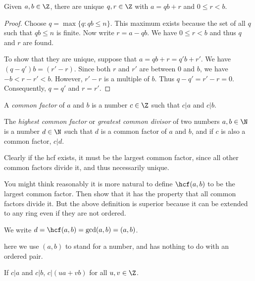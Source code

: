 \documentclass[a4paper]{article}
\begin{document}
  \begin{thm}
    Given $a, b\in \Z$, there are unique $q, r\in \Z$ with $a = qb + r$ and $0\leq r < b$.
  \end{thm}

  \begin{proof}
    Choose $q = \max\{q:qb \leq n\}$. This maximum exists because the set of all $q$ such that $qb\leq n$ is finite. Now write $r = a - qb$. We have $0\leq r < b$ and thus $q$ and $r$ are found.

    To show that they are unique, suppose that $a = qb + r = q'b + r'$. We have $(q - q')b = (r' - r)$. Since both $r$ and $r'$ are between $0$ and $b$, we have $-b < r - r' < b$. However, $r' - r$ is a multiple of $b$. Thus $q - q' = r' - r = 0$. Consequently, $q = q'$ and $r = r'$.
  \end{proof}

  \begin{defi}
    A \emph{common factor} of $a$ and $b$ is a number $c\in\Z$ such that $c|a$ and $c|b$.
  \end{defi}

  \begin{defi}
    The \emph{highest common factor} or \emph{greatest common divisor} of two numbers $a, b\in \N$ is a number $d\in \N$ such that $d$ is a common factor of $a$ and $b$, and if $c$ is also a common factor, $c|d$.

    Clearly if the hcf exists, it must be the largest common factor, since all other common factors divide it, and thus necessarily unique.
  \end{defi}
  \note You might think reasonably it is more natural to define $\hcf(a, b)$ to be the largest common factor. Then show that it has the property that all common factors divide it. But the above definition is superior because it can be extended to any ring even if they are not ordered.

  \begin{notation}
    We write $d = \hcf(a, b) = \gcd(a, b) = (a, b)$.

    \note here we use $(a, b)$ to stand for a number, and has nothing to do with an ordered pair.
  \end{notation}

  \begin{prop}
    If $c|a$ and $c|b$, $c|(ua + vb)$ for all $u, v\in \Z$.
  \end{prop}
\end{document}

